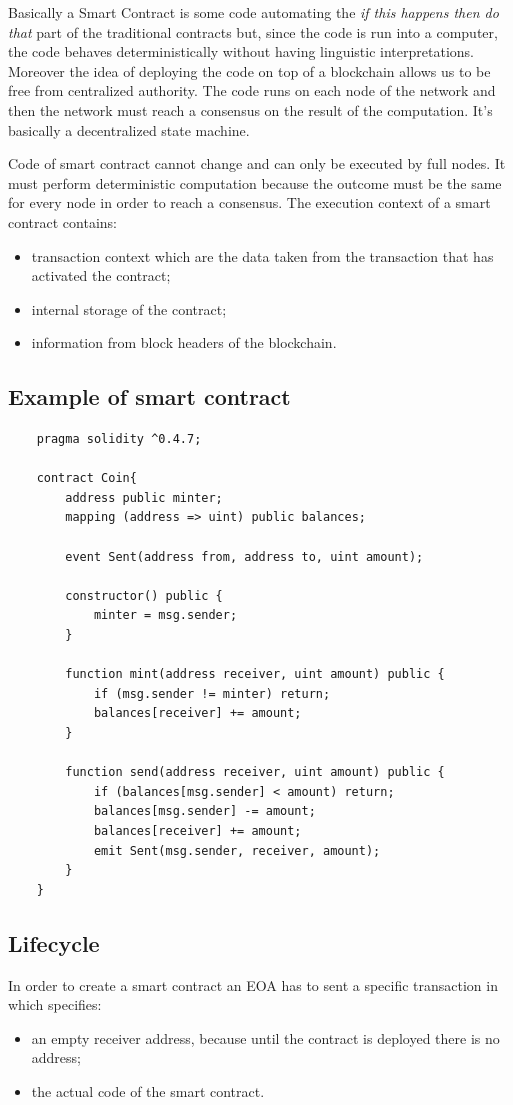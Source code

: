Basically a Smart Contract is some code automating the \emph{if this happens then do that} part of the traditional contracts but, since the code is run into a computer, the code behaves deterministically without having linguistic interpretations.
Moreover the idea of deploying the code on top of a blockchain allows us to be free from centralized authority.
The code runs on each node of the network and then the network must reach a consensus on the result of the computation.
It's basically a decentralized state machine.

Code of smart contract cannot change and can only be executed by full nodes.
It must perform deterministic computation because the outcome must be the same for every node in order to reach a consensus.
The execution context of a smart contract contains:
\begin{itemize}
    \item transaction context which are the data taken from the transaction that has activated the contract;
    \item internal storage of the contract;
    \item information from block headers of the blockchain.
\end{itemize}

\subsection{Example of smart contract}
\begin{verbatim}
    pragma solidity ^0.4.7;

    contract Coin{
        address public minter;
        mapping (address => uint) public balances;

        event Sent(address from, address to, uint amount);

        constructor() public {
            minter = msg.sender;
        }

        function mint(address receiver, uint amount) public {
            if (msg.sender != minter) return;
            balances[receiver] += amount;
        }

        function send(address receiver, uint amount) public {
            if (balances[msg.sender] < amount) return;
            balances[msg.sender] -= amount;
            balances[receiver] += amount;
            emit Sent(msg.sender, receiver, amount);
        }
    }
\end{verbatim}

\subsection{Lifecycle}
In order to create a smart contract an EOA has to sent a specific transaction in which specifies:
\begin{itemize}
    \item an empty receiver address, because until the contract is deployed there is no address;
    \item the actual code of the smart contract.
\end{itemize}

